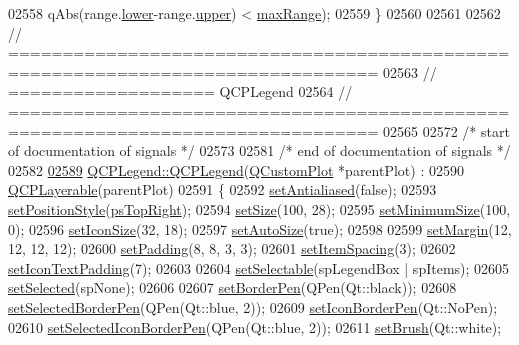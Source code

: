 \begin{DoxyCode}
02558           qAbs(range.\hyperlink{a00049_aa3aca3edb14f7ca0c85d912647b91745}{lower}-range.\hyperlink{a00049_ae44eb3aafe1d0e2ed34b499b6d2e074f}{upper}) < \hyperlink{a00049_a5ca51e7a2dc5dc0d49527ab171fe1f4f}{maxRange});
02559 \}
02560 
02561 
02562 \textcolor{comment}{// ================================================================================}
02563 \textcolor{comment}{// =================== QCPLegend}
02564 \textcolor{comment}{// ================================================================================}
02565 
02572 \textcolor{comment}{/* start of documentation of signals */}
02573 
02581 \textcolor{comment}{/* end of documentation of signals */}
02582 
\hypertarget{a00115_source_l02589}{}\hyperlink{a00045_a5dc42d73df80e7294414aee1170c4d2b}{02589} \hyperlink{a00045_a5dc42d73df80e7294414aee1170c4d2b}{QCPLegend::QCPLegend}(\hyperlink{a00030_d8/d00/a00186}{QCustomPlot} *parentPlot) :
02590   \hyperlink{a00044}{QCPLayerable}(parentPlot)
02591 \{
02592   \hyperlink{a00044_a4fd43e89be4a553ead41652565ff0581}{setAntialiased}(\textcolor{keyword}{false});
02593   \hyperlink{a00045_aecfd20e956460d1bdc65b79f48db533d}{setPositionStyle}(\hyperlink{a00045_aa61c3d82a6c7942dddefbf1ed1f7049fadc969b13706ba4fd802bbc27e0abb18a}{psTopRight});
02594   \hyperlink{a00045_ae1d42dbf91b0046f7324dd07a16dd43f}{setSize}(100, 28);
02595   \hyperlink{a00045_a012c09cb070eabe01cfb598ab188a4fc}{setMinimumSize}(100, 0);
02596   \hyperlink{a00045_a8b0740cce488bf7010da6beda6898984}{setIconSize}(32, 18);
02597   \hyperlink{a00045_a067da0c0e2b0e9ee2c623f4d986c0d06}{setAutoSize}(\textcolor{keyword}{true});
02598   
02599   \hyperlink{a00045_afa9e9681dbe3fa05302353a78cb34588}{setMargin}(12, 12, 12, 12);
02600   \hyperlink{a00045_a6dec710ef473c79c96e92feb7528ae7d}{setPadding}(8, 8, 3, 3);
02601   \hyperlink{a00045_a1bb966ee2b5f05b9d7e4866d2b1114c0}{setItemSpacing}(3);
02602   \hyperlink{a00045_a62973bd69d5155e8ea3141366e8968f6}{setIconTextPadding}(7);
02603   
02604   \hyperlink{a00045_aae042f6211e39305d13f7b18c1c301d9}{setSelectable}(spLegendBox | spItems);
02605   \hyperlink{a00045_a752c48b30f8ba870b55e79659385f107}{setSelected}(spNone);
02606   
02607   \hyperlink{a00045_a866a9e3f5267de7430a6c7f26a61db9f}{setBorderPen}(QPen(Qt::black));
02608   \hyperlink{a00045_a2c35d262953a25d96b6112653fbefc88}{setSelectedBorderPen}(QPen(Qt::blue, 2));
02609   \hyperlink{a00045_a2f2c93d18a651f4ff294bb3f026f49b8}{setIconBorderPen}(Qt::NoPen);
02610   \hyperlink{a00045_ade93aabe9bcccaf9cf46cec22c658027}{setSelectedIconBorderPen}(QPen(Qt::blue, 2));
02611   \hyperlink{a00045_a497bbcd38baa3598c08e2b3f48103f23}{setBrush}(Qt::white);

\end{DoxyCode}
